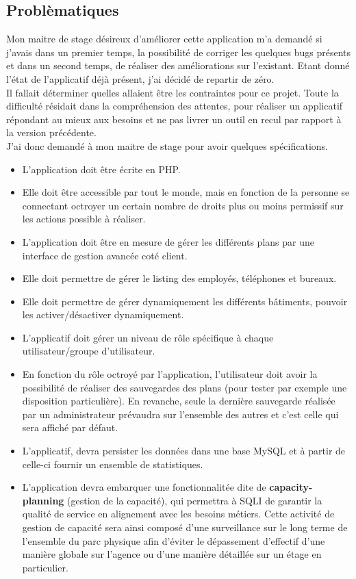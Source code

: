 \documentclass{report}
\newcommand{\jumpOne}{\\[1\baselineskip]}
\begin{document}
\subsection{Problèmatiques}
Mon maitre de stage désireux d'améliorer cette application m'a demandé si j'avais dans un premier temps, la possibilité de corriger les quelques bugs présents et dans un second temps, de réaliser des améliorations sur l'existant. Etant donné l'état de l'applicatif déjà présent, j'ai décidé de repartir de zéro. 
\jumpOne
Il fallait déterminer quelles allaient être les contraintes pour ce projet. Toute la difficulté résidait dans la compréhension des attentes, pour réaliser un applicatif répondant au mieux aux besoins et ne pas livrer un outil en recul par rapport à la version précédente. 
\jumpOne
J'ai donc demandé à mon maitre de stage pour avoir quelques spécifications. 

\begin{itemize}
	\item L'application doit être écrite en PHP.
	\item Elle doit être accessible par tout le monde, mais en fonction de la personne se connectant octroyer un certain nombre de droits plus ou moins permissif sur les actions possible à réaliser.
	\item L'application doit être en mesure de gérer les différents plans par une interface de gestion avancée coté client. 
	\item Elle doit permettre de gérer le listing des employés, téléphones et bureaux.
	\item Elle doit permettre de gérer dynamiquement les différents bâtiments, pouvoir les activer/désactiver dynamiquement. 
	\item L'applicatif doit gérer un niveau de rôle spécifique à chaque utilisateur/groupe d'utilisateur. 
	\item En fonction du rôle octroyé par l'application, l'utilisateur doit avoir la possibilité de réaliser des sauvegardes des plans (pour tester par exemple une disposition particulière). En revanche, seule la dernière sauvegarde réalisée par un administrateur prévaudra sur l'ensemble des autres et c'est celle qui sera affiché par défaut. 
	\item L'applicatif, devra persister les données dans une base \gls{MySQL} et à partir de celle-ci fournir un ensemble de statistiques. 
	\item L'application devra embarquer une fonctionnalitée dite de \textbf{\gls{capacity-planning}} (gestion de la capacité), qui permettra à SQLI de garantir la qualité de service en alignement avec les besoins métiers. Cette activité de gestion de capacité sera ainsi composé d'une surveillance sur le long terme de l'ensemble du parc physique afin d'éviter le dépassement d'effectif d'une manière globale sur l'agence ou d'une manière détaillée sur un étage en particulier. 
\end{itemize}
 
\end{document}
